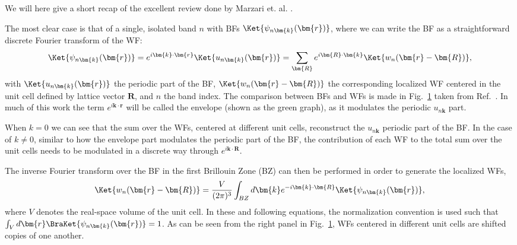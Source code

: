 We will here give a short recap of the excellent review done by Marzari et. al. \cite{Marzari2012}.

The most clear case is that of a single, isolated band $n$ with BFs $\Ket{\psi_{n\bm{k}}(\bm{r})}$, where we can write the BF as a straightforward discrete Fourier transform of the WF: 
\begin{equation}
	\label{eq:Theory_1bandwan}
	\Ket{\psi_{n\bm{k}}(\bm{r})} = e^{i\bm{k}\cdot\bm{r}} \Ket{u_{n\bm{k}}(\bm{r})} = \sum_{\bm{R}} e^{i \bm{R} \cdot \bm{k}} \Ket{w_n(\bm{r}-\bm{R})},
\end{equation}
with $\Ket{u_{n\bm{k}}(\bm{r})}$ the periodic part of the BF, $\Ket{w_n(\bm{r}-\bm{R})}$ the corresponding localized WF centered in the unit cell defined by lattice vector $\bm{R}$, and $n$ the band index.
The comparison between BFs and WFs is made in Fig.~\ref{fig:Theory_blochvswan} taken from Ref.~\cite{Marzari2012}.
In much of this work the term $e^{i\bm{k}\cdot\bm{r}}$ will be called the envelope (shown as the green graph), as it modulates the periodic $u_{n\bm{k}}$ part.
\begin{figure}
	\caption{\label{fig:Theory_blochvswan}}
\end{figure}
When $k=0$ we can see that the sum over the WFs, centered at different unit cells, reconstruct the $u_{n\bm{k}}$ periodic part of the BF.
In the case of $k \neq 0$, similar to how the envelope part modulates the periodic part of the BF, the contribution of each WF to the total sum over the unit cells needs to be modulated in a discrete way through $e^{i \bm{k} \cdot \bm{R}}$.

The inverse Fourier transform over the BF in the first Brillouin Zone (BZ) can then be performed in order to generate the localized WFs,
\begin{equation}
	\label{eq:Theory_wanfourier}
	\Ket{w_{n}(\bm{r} - \bm{R})} = \frac{V}{(2\pi)^3} \int_{BZ} d \bm{k} e^{-i \bm{k} \cdot \bm{R}} \Ket{\psi_{n\bm{k}}(\bm{r})},
\end{equation}
where $V$ denotes the real-space volume of the unit cell.
In these and following equations, the normalization convention is used such that $\int_V d\bm{r}\BraKet{\psi_{n\bm{k}}(\bm{r})} = 1$.
As can be seen from the right panel in Fig.~\ref{fig:Theory_blochvswan}, WFs centered in different unit cells are shifted copies of one another.

